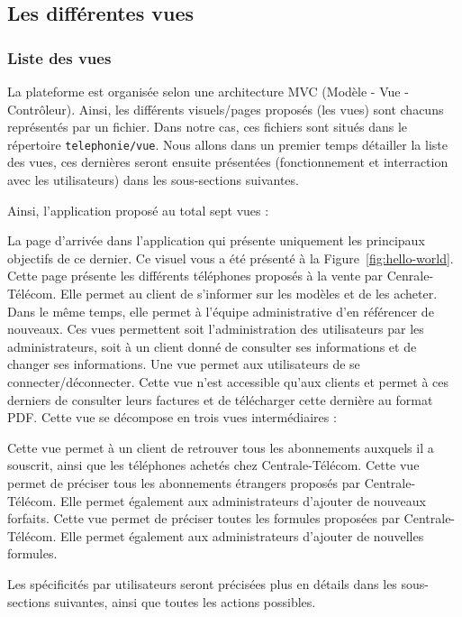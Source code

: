 \subsection{Les différentes vues}
\subsubsection{Liste des vues}
La plateforme est organisée selon une architecture MVC (Modèle - Vue - Contrôleur). Ainsi, les différents visuels/pages proposés (les vues) sont chacuns représentés par un fichier. Dans notre cas, ces fichiers sont situés dans le répertoire \texttt{telephonie/vue}. Nous allons dans un premier temps détailler la liste des vues, ces dernières seront ensuite présentées (fonctionnement et interraction avec les utilisateurs) dans les sous-sections suivantes.

Ainsi, l'application proposé au total sept vues :
\begin{itemize}
  La page d'arrivée dans l'application qui présente uniquement les principaux objectifs de ce dernier. Ce visuel vous a été présenté à la Figure~\ref{fig:hello-world}.
  Cette page présente les différents téléphones proposés à la vente par Cenrale-Télécom. Elle permet au client de s'informer sur les modèles et de les acheter. Dans le même temps, elle permet à l'équipe administrative d'en référencer de nouveaux.
  Ces vues permettent soit l'administration des utilisateurs par les administrateurs, soit à un client donné de consulter ses informations et de changer ses informations.
  Une vue permet aux utilisateurs de se connecter/déconnecter.
  Cette vue n'est accessible qu'aux clients et permet à ces derniers de consulter leurs factures et de télécharger cette dernière au format PDF.
  Cette vue se décompose en trois vues intermédiaires :
  \begin{itemize}
    Cette vue permet à un client de retrouver tous les abonnements auxquels il a souscrit, ainsi que les téléphones achetés chez Centrale-Télécom.
    Cette vue permet de préciser tous les abonnements étrangers proposés par Centrale-Télécom. Elle permet également aux administrateurs d'ajouter de nouveaux forfaits.
    Cette vue permet de préciser toutes les formules proposées par Centrale-Télécom. Elle permet également aux administrateurs d'ajouter de nouvelles formules.
  \end{itemize}
\end{itemize}
Les spécificités par utilisateurs seront précisées plus en détails dans les sous-sections suivantes, ainsi que toutes les actions possibles.

